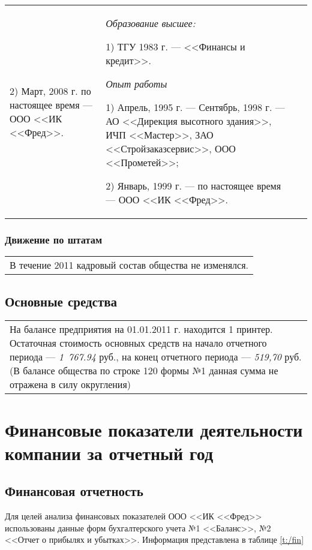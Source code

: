 \documentclass[a4paper,12pt]{scrreprt}
\begin{document}
\begin{longtable}{|p{}  p{}  p{} }
2) Март, 2008 г. по настоящее время --- ООО <<ИК <<Фред>>. 

& \emph{Образование высшее:} 

1) ТГУ 1983 г. --- <<Финансы и кредит>>. 

\emph{Опыт работы} 

1) Апрель, 1995 г. --- Сентябрь, 1998 г. --- АО <<Дирекция высотного здания>>, ИЧП <<Мастер>>, ЗАО <<Стройзаказсервис>>, ООО <<Прометей>>; 

2) Январь, 1999 г. --- по настоящее время --- ООО <<ИК <<Фред>>.
\end{longtable}

\normalsize
\rm

\subsection{Движение по штатам}
\begin{tabular}{|p{}} 
В течение 2011 кадровый состав общества не изменялся.
\end{tabular}

\section{Основные средства}
\begin{tabular}{|p{}} 
На балансе предприятия на 01.01.2011 г. находится 1 принтер. Остаточная стоимость основных средств на начало отчетного периода --- \emph{1~767.94} руб.,  на конец отчетного периода --- \emph{519,70} руб. (В балансе общества по строке 120 формы №1 данная сумма не отражена в силу округления)
\end{tabular}

\chapter{Финансовые показатели деятельности компании за отчетный год}


\section{Финансовая отчетность}

Для целей анализа финансовых показателей ООО <<ИК <<Фред>> использованы данные форм бухгалтерского учета №1 <<Баланс>>, №2 <<Отчет о прибылях и убытках>>. Информация представлена в таблице \ref{t:/fin}
\end{document}

